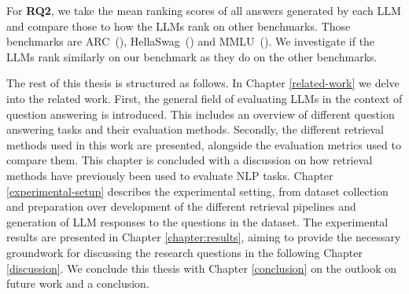 For \textbf{RQ2}, we take the mean ranking scores of all answers generated by each LLM and compare those to how the LLMs rank on other benchmarks.
Those benchmarks are ARC~(\cite{clark:2018:Think}), HellaSwag~(\cite{zellers:2019:HellaSwag}) and MMLU~(\cite{hendrycks:2020:Measuring}).
We investigate if the LLMs rank similarly on our benchmark as they do on the other benchmarks.

The rest of this thesis is structured as follows.
In Chapter \ref{related-work} we delve into the related work.
First, the general field of evaluating LLMs in the context of question answering is introduced.
This includes an overview of different question answering tasks and their evaluation methods.
Secondly, the different retrieval methods used in this work are presented, alongside the evaluation metrics used to compare them.
This chapter is concluded with a discussion on how retrieval methods have previously been used to evaluate NLP tasks.
Chapter \ref{experimental-setup} describes the experimental setting, from dataset collection and preparation over development of the different retrieval pipelines and generation of LLM responses to the questions in the dataset.
The experimental results are presented in Chapter \ref{chapter:results}, aiming to provide the necessary groundwork for discussing the research questions in the following Chapter \ref{discussion}.
We conclude this thesis with Chapter \ref{conclusion} on the outlook on future work and a conclusion.